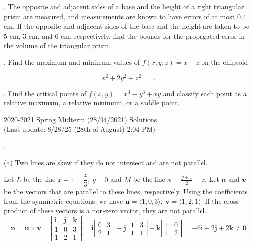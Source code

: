\documentclass{article}
\begin{document}
\hfill

. The opposite and adjacent sides of a base and the height of a right triangular prism are measured, and measurements are known to have errors of at most $0.4$ cm. If the opposite and adjacent sides of the base and the height are taken to be $5$ cm, $3$ cm, and $6$ cm, respectively, find the bounds for the propagated error in the volume of the triangular prism.

\hfill

. Find the maximum and minimum values of $f(x,y,z)=x-z$ on the ellipsoid

\[x^2+2y^2+z^2=1.\]

\hfill

. Find the critical points of $f(x,y)=x^3-y^3+xy$ and classify each point as a relative maximum, a relative minimum, or a saddle point.

\newpage

\begin{center}
2020-2021 Spring Midterm (28/04/2021) Solutions\\
(Last update: 8/28/25 (28th of August) 2:04 PM)
\end{center}

.

\hfill

\noindent (a) Two lines are skew if they do not intersect and are not parallel.

\hfill

\noindent Let $L$ be the line $x-1=\dfrac z3,\: y=0$  and $M$ be the line $\displaystyle x=\frac{y+1}2=z$. Let $\mathbf u$ and $\mathbf v$ be the vectors that are parallel to these lines, respectively. Using the coefficients from the symmetric equations, we have $\mathbf u=\langle1,0,3\rangle, \:\mathbf v= \langle1,2,1\rangle$. If the cross product of these vectors is a non-zero vector, they are not parallel.
\[\mathbf{n}=\mathbf{u}\times\mathbf{v}=\left|\begin{array}{ccc}
\mathbf{i}&\mathbf{j}&\mathbf{k}\\
1&0&3\\
1&2&1
\end{array}\right|=\mathbf{i}\left|\begin{array}{cc}
0&3\\2&1
\end{array}\right|-\mathbf{j}\left|\begin{array}{cc}
1&3\\1&1
\end{array}\right|+\mathbf{k}\left|\begin{array}{cc}
1&0\\1&2
\end{array}\right|=-6\mathbf{i}+2\mathbf{j}+2\mathbf{k}\neq\mathbf{0}\]
\end{document}
